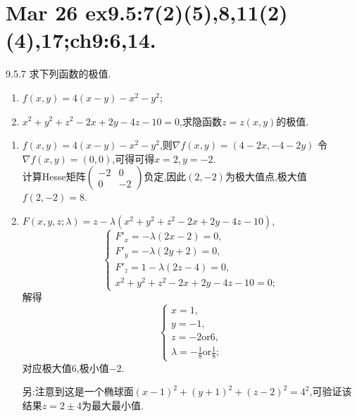 \section{Mar 26 ex9.5:7(2)(5),8,11(2)(4),17;ch9:6,14.}
\begin{exercise}{9.5.7}
    求下列函数的极值.
    \begin{enumerate}
        \item[(2)] $f(x,y)=4(x-y)-x^2-y^2$;
        \item[(5)] $x^2+y^2+z^2-2x+2y-4z-10=0$,求隐函数$z=z(x,y)$的极值.
    \end{enumerate}
\end{exercise}
\begin{solution}
\begin{enumerate}
    \item[(2)] $f(x,y)=4(x-y)-x^2-y^2$,则$\nabla f(x,y)=(4-2x,-4-2y)$
        令$\nabla f(x,y)=(0,0)$,可得可得$x=2,y=-2$.\\
        计算Hesse矩阵$\begin{pmatrix}
            -2&0\\
            0&-2
        \end{pmatrix}$负定,因此$(2,-2)$为极大值点,极大值$f(2,-2)=8$.
    \item[(5)] $F(x,y,z;\lambda)=z-\lambda(x^2+y^2+z^2-2x+2y-4z-10)$,
    $$\begin{cases}
        F'_x=-\lambda(2x-2)=0,\\
        F'_y=-\lambda(2y+2)=0,\\
        F'_z=1-\lambda(2z-4)=0,\\
        x^2+y^2+z^2-2x+2y-4z-10=0;
    \end{cases}$$
    解得
    $$\begin{cases}
       x=1,\\
       y=-1,\\
       z=-2\text{or}6,\\
       \lambda=-\frac{1}{8}\text{or}\frac{1}{8};
    \end{cases}$$
    对应极大值$6$,极小值$-2$.

    另:注意到这是一个椭球面$(x-1)^2+(y+1)^2+(z-2)^2=4^2$,可验证该结果$z=2\pm 4$为最大最小值.
\end{enumerate}
\end{solution}

